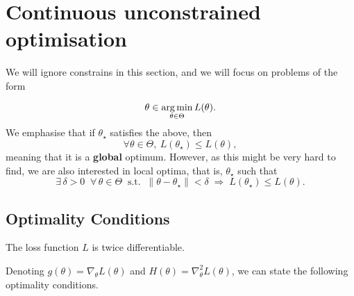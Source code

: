 \begin{mdframed}[style=ejemplo, frametitle={\center Example: XXX}]

\end{mdframed}


\section{Continuous unconstrained optimisation} %
\label{sec:continuous_optimisation}

We will ignore constrains in this section, and we will focus on problems of the form

\begin{equation}
	\theta \in \operatorname*{arg\,min}_{\theta\in\Theta} L(\theta).
\end{equation}
We emphasise that if $\theta_\star$ satisfies the above, then
\begin{equation}
	\forall \theta\in\Theta,~ L(\theta_\star) \leq L(\theta),
\end{equation}
meaning that it is a \textbf{global} optimum. However, as this might be very hard to find, we are also interested in local optima, that is, $\theta_\star$  such that 
\begin{equation}
\exists\, \delta > 0 \;\; \forall\, \theta \in \Theta \;\; 
\text{s.t.} \;\; 
\|\theta - \theta_\star\| < \delta 
\;\Rightarrow\;
L(\theta_\star) \le L(\theta).
\end{equation}


\subsection{Optimality Conditions}
\label{subsec:optimality_conditions}


\begin{assumption}
The loss function $L$ is twice differentiable.
\end{assumption}

Denoting $g(\theta) = \nabla_\theta L(\theta)$ and $H(\theta) = \nabla_\theta^2L(\theta)$, we can state the following optimality conditions. 









